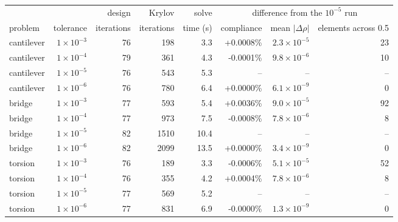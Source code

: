 \begin{tabular}{lrrrrrrr}
\toprule
 & & design & Krylov & solve & \multicolumn{3}{c}{difference from the $10^{-5}$ run} \\
\cmidrule(lr){6-8}
problem & tolerance & iterations & iterations & time (s) & compliance & mean $|\Delta\rho|$ & elements across 0.5 \\
\midrule
cantilever & $1\times10^{-3}$ & 76 & 198 & 3.3 & +0.0008\% & $2.3\times10^{-5}$ & 23 \\
cantilever & $1\times10^{-4}$ & 79 & 361 & 4.3 & -0.0001\% & $9.8\times10^{-6}$ & 10 \\
cantilever & $1\times10^{-5}$ & 76 & 543 & 5.3 & -- & -- & -- \\
cantilever & $1\times10^{-6}$ & 76 & 780 & 6.4 & +0.0000\% & $6.1\times10^{-9}$ & 0 \\
bridge & $1\times10^{-3}$ & 77 & 593 & 5.4 & +0.0036\% & $9.0\times10^{-5}$ & 92 \\
bridge & $1\times10^{-4}$ & 77 & 973 & 7.5 & -0.0008\% & $7.8\times10^{-6}$ & 8 \\
bridge & $1\times10^{-5}$ & 82 & 1510 & 10.4 & -- & -- & -- \\
bridge & $1\times10^{-6}$ & 82 & 2099 & 13.5 & +0.0000\% & $3.4\times10^{-9}$ & 0 \\
torsion & $1\times10^{-3}$ & 76 & 189 & 3.3 & -0.0006\% & $5.1\times10^{-5}$ & 52 \\
torsion & $1\times10^{-4}$ & 76 & 355 & 4.2 & +0.0004\% & $7.8\times10^{-6}$ & 8 \\
torsion & $1\times10^{-5}$ & 77 & 569 & 5.2 & -- & -- & -- \\
torsion & $1\times10^{-6}$ & 77 & 831 & 6.9 & -0.0000\% & $1.3\times10^{-9}$ & 0 \\
\bottomrule
\end{tabular}
